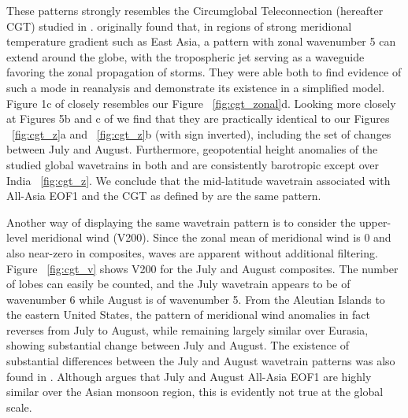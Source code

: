 	These patterns strongly resembles the Circumglobal Teleconnection (hereafter CGT) studied in \citet{Ding2005a}. \citet{Branstator2002} originally found that, in regions of strong meridional temperature gradient such as East Asia, a pattern with zonal wavenumber 5 can extend around the globe, with the tropospheric jet serving as a waveguide favoring the zonal propagation of storms. They were able both to find evidence of such a mode in reanalysis and demonstrate its existence in a simplified model. Figure 1c of \citet{Branstator2002} closely resembles our Figure ~\ref{fig:cgt_zonal}d. Looking more closely at Figures 5b and c of \citet{Ding2005a} we find that they are practically identical to our Figures ~\ref{fig:cgt_z}a and ~\ref{fig:cgt_z}b (with sign inverted), including the set of changes between July and August. Furthermore, geopotential height anomalies of the studied global wavetrains in both \citet{Branstator2002} and \citet{Ding2005a} are consistently barotropic except over India ~\ref{fig:cgt_z}. We conclude that the mid-latitude wavetrain associated with All-Asia EOF1 and the CGT as defined by \citet{Ding2005a} are the same pattern.
	
	Another way of displaying the same wavetrain pattern is to consider the upper-level meridional wind (V200). Since the zonal mean of meridional wind is 0 \citep{Ding2007} and also near-zero in composites, waves are apparent without additional filtering. Figure ~\ref{fig:cgt_v} shows V200 for the July and August composites. The number of lobes can easily be counted, and the July wavetrain appears to be of wavenumber 6 while August is of wavenumber 5. From the Aleutian Islands to the eastern United States, the pattern of meridional wind anomalies in fact reverses from July to August, while remaining largely similar over Eurasia, showing substantial change between July and August. The existence of substantial differences between the July and August wavetrain patterns was also found in \citet{Ding2005a}. Although \citet{Day2015} argues that July and August All-Asia EOF1 are highly similar over the Asian monsoon region, this is evidently not true at the global scale.

		
